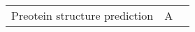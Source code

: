 \begin{center}
\begin{tabular}{l c c}
    Preotein structure prediction & A
\end{tabular}
\end{center}